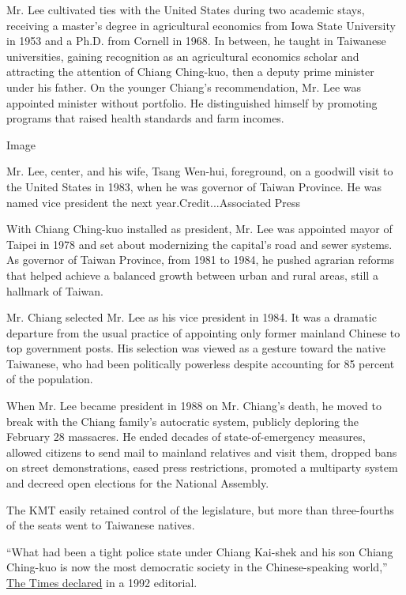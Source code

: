 Mr. Lee cultivated ties with the United States during two academic
stays, receiving a master's degree in agricultural economics from Iowa
State University in 1953 and a Ph.D. from Cornell in 1968. In between,
he taught in Taiwanese universities, gaining recognition as an
agricultural economics scholar and attracting the attention of Chiang
Ching-kuo, then a deputy prime minister under his father. On the younger
Chiang's recommendation, Mr. Lee was appointed minister without
portfolio. He distinguished himself by promoting programs that raised
health standards and farm incomes.

Image

Mr. Lee, center, and his wife, Tsang Wen-hui, foreground, on a goodwill
visit to the United States in 1983, when he was governor of Taiwan
Province. He was named vice president the next year.Credit...Associated
Press

With Chiang Ching-kuo installed as president, Mr. Lee was appointed
mayor of Taipei in 1978 and set about modernizing the capital's road and
sewer systems. As governor of Taiwan Province, from 1981 to 1984, he
pushed agrarian reforms that helped achieve a balanced growth between
urban and rural areas, still a hallmark of Taiwan.

Mr. Chiang selected Mr. Lee as his vice president in 1984. It was a
dramatic departure from the usual practice of appointing only former
mainland Chinese to top government posts. His selection was viewed as a
gesture toward the native Taiwanese, who had been politically powerless
despite accounting for 85 percent of the population.

When Mr. Lee became president in 1988 on Mr. Chiang's death, he moved to
break with the Chiang family's autocratic system, publicly deploring the
February 28 massacres. He ended decades of state-of-emergency measures,
allowed citizens to send mail to mainland relatives and visit them,
dropped bans on street demonstrations, eased press restrictions,
promoted a multiparty system and decreed open elections for the National
Assembly.

The KMT easily retained control of the legislature, but more than
three-fourths of the seats went to Taiwanese natives.

``What had been a tight police state under Chiang Kai-shek and his son
Chiang Ching-kuo is now the most democratic society in the
Chinese-speaking world,''
\href{https://www.nytimes.com/1992/02/22/opinion/don-t-stifle-democracy-in-taiwan.html}{The
Times declared} in a 1992 editorial.

